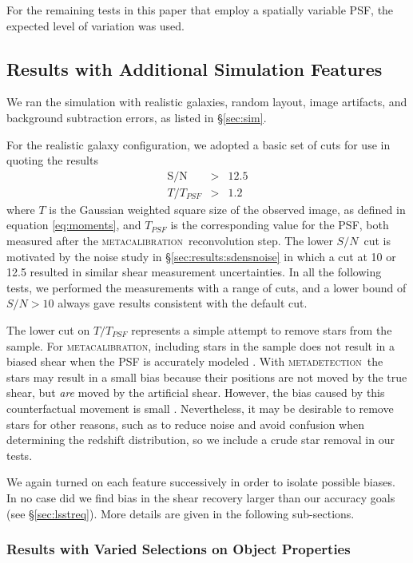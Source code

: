 \documentclass[twocolumn,twocolappendix,astrosym]{openjournal}
\newcommand{\snr}{$S/N$}
\newcommand{\mcal}{\textsc{metacalibration}}
\newcommand{\mdet}{\textsc{metadetection}}
\begin{document}
For the remaining tests in this paper that employ a spatially variable PSF, the
expected level of variation was used.

\subsection{Results with Additional Simulation Features} \label{sec:results:more}

We ran the simulation with realistic galaxies, random layout, image
artifacts, and background subtraction errors, as listed in \S \ref{sec:sim}.

For the realistic galaxy configuration, we adopted a basic set of cuts for use
in quoting the results
\begin{eqnarray} \label{eq:basiccuts}
    \mathrm{S/N} & > & 12.5 \\
    T/T_{PSF} & > & 1.2
\end{eqnarray}
where $T$ is the Gaussian weighted square size of the observed image, as
defined in equation \ref{eq:moments}, and $T_{PSF}$ is the corresponding value
for the PSF, both measured after the \mcal\ reconvolution step. The lower \snr\
cut is motivated by the noise study in \S \ref{sec:results:sdensnoise} in which
a cut at 10 or 12.5 resulted in similar shear measurement uncertainties. In all
the following tests, we performed the measurements with a range of cuts, and a
lower bound of $S/N > 10$ always gave results consistent with the default cut.

The lower cut on $T/T_{PSF}$ represents a simple attempt to remove stars from
the sample.  For \mcal, including stars in the sample does not result in a
biased shear when the PSF is accurately modeled \citep{SheldonMcal2017}.  With
\mdet\ the stars may result in a small bias because their positions are not
moved by the true shear, but {\it are} moved by the artificial shear. However,
the bias caused by this counterfactual movement is small \citep{mdet20}.
Nevertheless, it may be desirable to remove stars for other reasons, such as to
reduce noise and avoid confusion when determining the redshift distribution, so
we include a crude star removal in our tests.

We again turned on each feature successively in order to isolate possible
biases.  In no case did we find bias in the shear recovery larger than our
accuracy goals (see \S \ref{sec:lsstreq}).  More details are given in the
following sub-sections.

\subsubsection{Results with Varied Selections on Object Properties} \label{sec:results:select}
\end{document}
